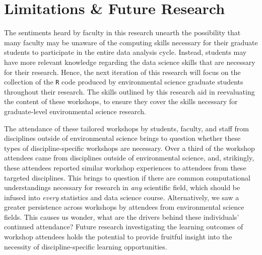 \documentclass[12pt]{article}
\begin{document}
\section{Limitations \& Future Research} 
\label{sec:future}

\noindent The sentiments heard by faculty in this research unearth the
possibility that many faculty may be unaware of the computing skills necessary
for their graduate students to participate in the entire data analysis cycle.
Instead, students may have more relevant knowledge regarding the data science
skills that are necessary for their research. Hence, the next iteration of this
research will focus on the collection of the \texttt{R} code produced
by environmental science graduate students throughout their research. The skills
outlined by this research aid in reevaluating the content of these workshops, to
ensure they cover the skills necessary for graduate-level environmental science
research. 


\quad The attendance of these tailored workshops by students,
faculty, and staff from disciplines outside of environmental science brings
to question whether these types of discipline-specific workshops are necessary.
Over a third of the workshop attendees came from disciplines outside of 
environmental science, and, strikingly, these attendees reported similar
workshop experiences to attendees from these targeted disciplines. This brings
to question if there are common computational understandings necessary for
research in \emph{any} scientific field, which should be infused into 
\emph{every} statistics and data science course. Alternatively, we saw a greater
persistence across workshops by attendees from environmental science fields. 
This causes us wonder, what are the drivers behind these individuals' continued
attendance? Future research investigating the learning outcomes of workshop
attendees holds the potential to provide fruitful insight into the necessity of
discipline-specific learning opportunities. 

\end{document}
